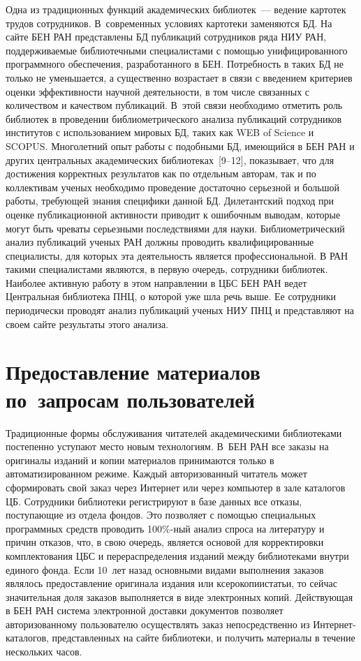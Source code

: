 \begin{multicols}{2}
   Одна из традиционных функций академических библиотек~--- ведение картотек 
трудов сотрудников. В~современных условиях картотеки заменяются БД. На 
сайте БЕН РАН представлены БД пуб\-ли\-ка\-ций сотрудников ряда НИУ РАН, 
поддерживаемые биб\-лио\-теч\-ны\-ми специалистами с помощью унифицированного 
программного обеспечения, разработанного в БЕН. Потребность в таких БД не 
только не уменьшается, а существенно возрастает в связи с введением критериев оценки 
эффективности научной деятельности, в том числе связанных с количеством и качеством 
публикаций. В~этой связи необходимо отметить роль библиотек в проведении 
биб\-лио\-мет\-ри\-че\-ско\-го анализа пуб\-ли\-ка\-ций сотрудников институтов с использованием 
мировых БД, таких как WEB of Science и \mbox{SCOPUS}. Многолетний 
опыт работы с подобными БД, име\-ющий\-ся в БЕН РАН и других центральных 
академических библиотеках~[9--12], показывает, что для 
достижения корректных результатов как по отдельным авторам, так и по коллективам 
ученых необходимо проведение достаточно серьезной и большой работы, требующей 
знания специфики данной БД. Дилетантский подход при оценке пуб\-ли\-ка\-ци\-он\-ной 
активности приводит к ошибочным выводам, которые могут быть чреваты серьезными 
последствиями для науки. Библиометрический анализ публикаций ученых РАН должны 
проводить квалифицированные специалисты, для которых эта деятельность является 
профессиональной. В РАН такими специалистами являются, в первую очередь, сотрудники 
библиотек. Наиболее активную работу в этом направлении в ЦБС БЕН РАН ведет 
Центральная библиотека ПНЦ, о которой уже шла речь выше. Ее сотрудники 
периодически проводят анализ публикаций ученых НИУ ПНЦ и представляют на своем 
сайте результаты этого анализа. 

\section{Предоставление материалов по~запросам пользователей} 
   
   Традиционные формы обслуживания читателей академическими библиотеками 
постепенно уступают место новым технологиям. В~БЕН РАН все заказы на оригиналы 
изданий и копии материалов принимаются только в автоматизированном режиме. Каждый 
авторизованный читатель может сформировать свой заказ через Интернет или через 
компьютер в зале каталогов ЦБ. Сотрудники биб\-лио\-те\-ки регистрируют в базе данных все 
отказы, поступающие из отдела фондов. Это позволяет с помощью специальных 
программных средств проводить 100\%-ный анализ спроса на литературу и причин отказов, 
что, в свою очередь, является основой для корректировки комплектования ЦБС и 
перераспределения изданий между библиотеками внутри единого фонда. Если 10~лет 
назад основными видами выполнения заказов являлось пред\-остав\-ле\-ние оригинала издания 
или ксерокопии\linebreak статьи, то сейчас значительная доля заказов выполняется в виде 
электронных копий. Действующая в БЕН РАН сис\-те\-ма электронной доставки документов 
позволяет авторизованному пользователю осуществлять заказ непосредственно из 
Ин\-тер\-нет-ка\-та\-ло\-гов, представленных на сайте библиотеки, и получить материалы в 
течение нескольких часов. 
{

}
\end{multicols}
